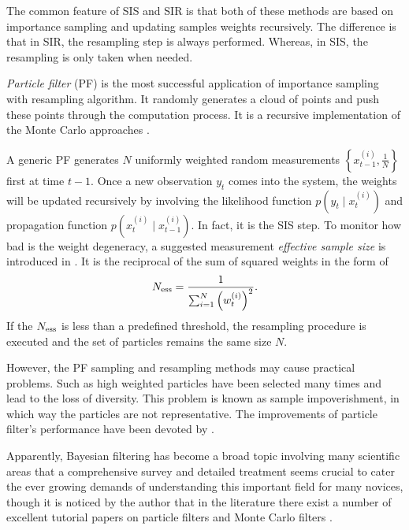 The common feature of SIS and SIR is that both of these methods are based on importance sampling and updating samples weights recursively. The difference is that in SIR, the resampling step is always performed. Whereas, in SIS, the resampling is only taken when needed. 


\textit{Particle filter} (PF) is the most successful application of importance sampling with resampling algorithm. It randomly generates a cloud of points and push these points through the computation process. It is a recursive implementation of the Monte Carlo approaches \citep{doucet2009tutorial}. 


A generic PF generates $N$ uniformly weighted random measurements $\left\lbrace x_{t-1}^{(i)},\frac{1}{N} \right\rbrace$ first at time $t-1$. Once a new observation $y_t$ comes into the system, the weights will be updated recursively by involving the likelihood function $p(y_t\mid x_t^{(i)})$ and propagation function $p(x_t^{(i)}\mid x_{t-1}^{(i)})$. In fact, it is the SIS step. To monitor how bad is the weight degeneracy, a suggested measurement \textit{effective sample size} is introduced in \citep{kong1994sequential}. It is the reciprocal of the sum of squared weights in the form of 
\begin{equation}
N_{\mbox{\scriptsize ess}} = \frac{1}{\sum_{i=1}^{N}\left(w_t^{(i)} \right)^2}. 
\end{equation}
If the $N_{\mbox{\scriptsize ess}}$ is less than a predefined threshold, the resampling procedure is executed and the set of particles remains the same size $N$. 



However, the PF sampling and resampling methods may cause practical problems. Such as high weighted particles have been selected many times and lead to the loss of diversity. This problem is known as sample impoverishment, in which way the particles are not representative. The improvements of particle filter's performance have been devoted by \citep{carpenter1999improved, godsill2001maximum, stavropoulos2001improved, smcmip2011}. 


Apparently, Bayesian filtering has become a broad topic involving many scientific areas that a comprehensive survey and detailed treatment seems crucial to cater the ever growing demands of understanding this important field for many novices, though it is noticed by the author that in the literature there exist a number of excellent tutorial papers on particle filters and Monte Carlo filters \citep{chen2003bayesian, doucet2000sequential, chen2012monte, doucet2000rao}.
 



